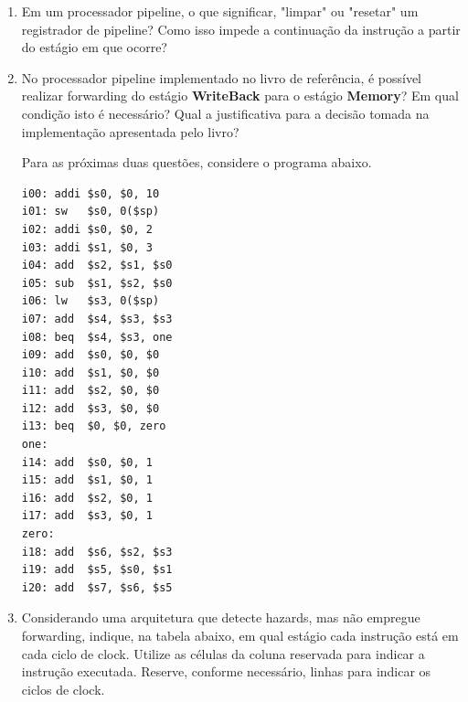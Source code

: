 \documentclass{article}
\begin{document}
\begin{enumerate}
\item Em um processador pipeline, o que significar, "limpar" ou "resetar" um registrador de pipeline? Como isso impede a continuação da instrução a partir do estágio em que ocorre?

\item No processador pipeline implementado no livro de referência, é possível realizar forwarding do estágio \textbf{WriteBack} para o estágio \textbf{Memory}? Em qual condição isto é necessário? Qual a justificativa para a decisão tomada na implementação apresentada pelo livro?

Para as próximas duas questões, considere o programa abaixo.

\begin{center}
    \begin{minipage}{0.35\textwidth}
        \begin{lstlisting}[frame=single]
i00: addi $s0, $0, 10
i01: sw   $s0, 0($sp)
i02: addi $s0, $0, 2
i03: addi $s1, $0, 3
i04: add  $s2, $s1, $s0
i05: sub  $s1, $s2, $s0
i06: lw   $s3, 0($sp)
i07: add  $s4, $s3, $s3
i08: beq  $s4, $s3, one
i09: add  $s0, $0, $0
i10: add  $s1, $0, $0
i11: add  $s2, $0, $0
i12: add  $s3, $0, $0
i13: beq  $0, $0, zero
one:
i14: add  $s0, $0, 1
i15: add  $s1, $0, 1
i16: add  $s2, $0, 1
i17: add  $s3, $0, 1
zero:
i18: add  $s6, $s2, $s3
i19: add  $s5, $s0, $s1
i20: add  $s7, $s6, $s5
        \end{lstlisting}
    \end{minipage}
\end{center}

\pagebreak

\item Considerando uma arquitetura que detecte hazards, mas não empregue forwarding, indique, na tabela abaixo, em qual estágio cada instrução está em cada ciclo de clock. Utilize as células da coluna reservada para indicar a instrução executada. Reserve, conforme necessário, linhas para indicar os ciclos de clock.


\end{enumerate}
\end{document}
